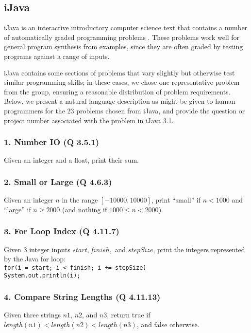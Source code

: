 \documentclass{sig-alternate}
\begin{document}
\subsection{iJava}


iJava is an interactive introductory computer science text that contains a number of automatically graded programming problems \cite{iJava, Moll:2011:IOI:1968521.1968535}. These problems work well for general program synthesis from examples, since they are often graded by testing programs against a range of inputs.

iJava contains some sections of problems that vary slightly but otherwise test similar programming skills; in these cases, we chose one representative problem from the group, ensuring a reasonable distribution of problem requirements. Below, we present a natural language description as might be given to human programmers for the 23 problems chosen from iJava, and provide the question or project number associated with the problem in iJava 3.1.


\subsubsection*{1. Number IO (Q 3.5.1)}
Given an integer and a float, print their sum.

\subsubsection*{2. Small or Large (Q 4.6.3)}
Given an integer $n$ in the range $[-10000, 10000]$, print ``small'' if $n < 1000$ and ``large'' if $n \ge 2000$ (and nothing if $1000 \le n < 2000$).

\subsubsection*{3. For Loop Index (Q 4.11.7)}
Given 3 integer inputs $start, finish,$ and $stepSize$, print the integers represented by the Java for loop: \\
\texttt{for(i = start; i < finish; i += stepSize) \\ \- \- \- \- System.out.println(i);}

\subsubsection*{4. Compare String Lengths (Q 4.11.13)}
Given three strings $n1$, $n2$, and $n3$, return true if $length(n1) < length(n2) < length(n3)$, and false otherwise.
\end{document}
